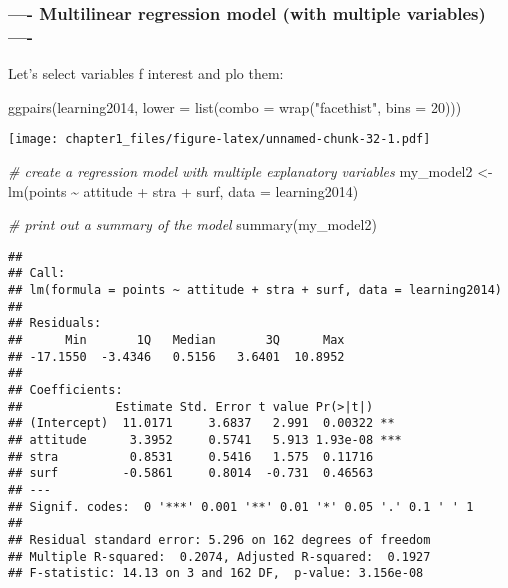 \documentclass[
]{article}
\newenvironment{Shaded}{\begin{snugshade}}{\end{snugshade}}
\newcommand{\AttributeTok}[1]{\textcolor[rgb]{0.77,0.63,0.00}{#1}}
\newcommand{\CommentTok}[1]{\textcolor[rgb]{0.56,0.35,0.01}{\textit{#1}}}
\newcommand{\DecValTok}[1]{\textcolor[rgb]{0.00,0.00,0.81}{#1}}
\newcommand{\FunctionTok}[1]{\textcolor[rgb]{0.00,0.00,0.00}{#1}}
\newcommand{\NormalTok}[1]{#1}
\newcommand{\OtherTok}[1]{\textcolor[rgb]{0.56,0.35,0.01}{#1}}
\newcommand{\SpecialCharTok}[1]{\textcolor[rgb]{0.00,0.00,0.00}{#1}}
\newcommand{\StringTok}[1]{\textcolor[rgb]{0.31,0.60,0.02}{#1}}
\begin{document}
\hypertarget{multilinear-regression-model-with-multiple-variables--}{%
\subsubsection{---- Multilinear regression model (with multiple
variables)
----}\label{multilinear-regression-model-with-multiple-variables--}}

Let's select variables f interest and plo them:

\begin{Shaded}
\begin{Highlighting}[]
\FunctionTok{ggpairs}\NormalTok{(learning2014, }\AttributeTok{lower =} \FunctionTok{list}\NormalTok{(}\AttributeTok{combo =} \FunctionTok{wrap}\NormalTok{(}\StringTok{"facethist"}\NormalTok{, }\AttributeTok{bins =} \DecValTok{20}\NormalTok{)))}
\end{Highlighting}
\end{Shaded}

\texttt{[image: chapter1\_files/figure-latex/unnamed-chunk-32-1.pdf]}

\begin{Shaded}
\begin{Highlighting}[]
\CommentTok{\# create a regression model with multiple explanatory variables}
\NormalTok{my\_model2 }\OtherTok{\textless{}{-}} \FunctionTok{lm}\NormalTok{(points }\SpecialCharTok{\textasciitilde{}}\NormalTok{ attitude }\SpecialCharTok{+}\NormalTok{ stra }\SpecialCharTok{+}\NormalTok{ surf, }\AttributeTok{data =}\NormalTok{ learning2014)}

\CommentTok{\# print out a summary of the model}
\FunctionTok{summary}\NormalTok{(my\_model2)}
\end{Highlighting}
\end{Shaded}

\begin{verbatim}
## 
## Call:
## lm(formula = points ~ attitude + stra + surf, data = learning2014)
## 
## Residuals:
##      Min       1Q   Median       3Q      Max 
## -17.1550  -3.4346   0.5156   3.6401  10.8952 
## 
## Coefficients:
##             Estimate Std. Error t value Pr(>|t|)    
## (Intercept)  11.0171     3.6837   2.991  0.00322 ** 
## attitude      3.3952     0.5741   5.913 1.93e-08 ***
## stra          0.8531     0.5416   1.575  0.11716    
## surf         -0.5861     0.8014  -0.731  0.46563    
## ---
## Signif. codes:  0 '***' 0.001 '**' 0.01 '*' 0.05 '.' 0.1 ' ' 1
## 
## Residual standard error: 5.296 on 162 degrees of freedom
## Multiple R-squared:  0.2074, Adjusted R-squared:  0.1927 
## F-statistic: 14.13 on 3 and 162 DF,  p-value: 3.156e-08
\end{verbatim}
\end{document}
